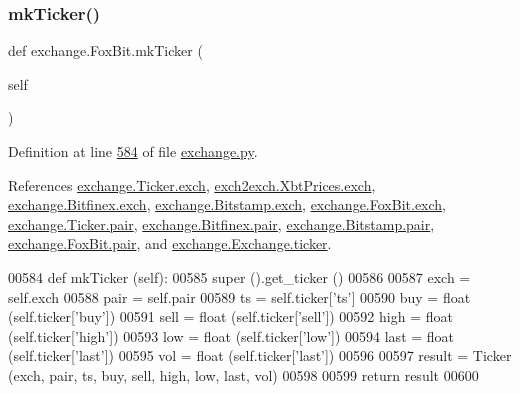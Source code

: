 \subsubsection{\texorpdfstring{mk\+Ticker()}{mkTicker()}}
{\footnotesize\ttfamily def exchange.\+Fox\+Bit.\+mk\+Ticker (\begin{DoxyParamCaption}\item[{}]{self }\end{DoxyParamCaption})}



Definition at line \hyperlink{exchange_8py_source_l00584}{584} of file \hyperlink{exchange_8py_source}{exchange.\+py}.



References \hyperlink{exchange_8py_source_l00057}{exchange.\+Ticker.\+exch}, \hyperlink{exch2exch_8py_source_l00064}{exch2exch.\+Xbt\+Prices.\+exch}, \hyperlink{exchange_8py_source_l00424}{exchange.\+Bitfinex.\+exch}, \hyperlink{exchange_8py_source_l00499}{exchange.\+Bitstamp.\+exch}, \hyperlink{exchange_8py_source_l00567}{exchange.\+Fox\+Bit.\+exch}, \hyperlink{exchange_8py_source_l00058}{exchange.\+Ticker.\+pair}, \hyperlink{exchange_8py_source_l00425}{exchange.\+Bitfinex.\+pair}, \hyperlink{exchange_8py_source_l00500}{exchange.\+Bitstamp.\+pair}, \hyperlink{exchange_8py_source_l00568}{exchange.\+Fox\+Bit.\+pair}, and \hyperlink{exchange_8py_source_l00188}{exchange.\+Exchange.\+ticker}.


\begin{DoxyCode}
00584     \textcolor{keyword}{def }mkTicker (self): 
00585         super ().get\_ticker ()
00586         
00587         exch = self.exch
00588         pair = self.pair
00589         ts   = self.ticker[\textcolor{stringliteral}{'ts'}]
00590         buy  = float (self.ticker[\textcolor{stringliteral}{'buy'}])
00591         sell = float (self.ticker[\textcolor{stringliteral}{'sell'}])
00592         high = float (self.ticker[\textcolor{stringliteral}{'high'}])
00593         low  = float (self.ticker[\textcolor{stringliteral}{'low'}])
00594         last = float (self.ticker[\textcolor{stringliteral}{'last'}])
00595         vol  = float (self.ticker[\textcolor{stringliteral}{'last'}])
00596         
00597         result = Ticker (exch, pair, ts, buy, sell, high, low, last, vol)
00598         
00599         \textcolor{keywordflow}{return} result
00600         
\end{DoxyCode}
\mbox{\label{classexchange_1_1_fox_bit_a813481c37754cc0c6e0b1cefa0ec0889}} 
